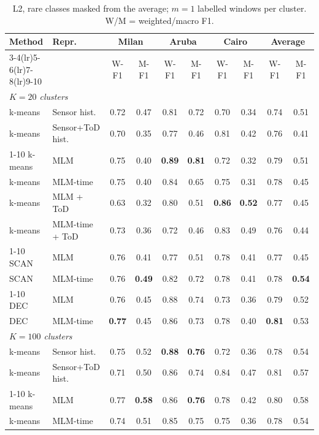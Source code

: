 \begin{table}[t]
\centering\small
\caption{L2, rare classes masked from the average; $m=1$ labelled windows per cluster. W/M = weighted/macro F1.}
\label{tab:l2_masked_m1}
\setlength{\tabcolsep}{4pt}
\begin{tabular}{llcccccc|cc}
\toprule
Method & Repr. & \multicolumn{2}{c}{Milan} & \multicolumn{2}{c}{Aruba} & \multicolumn{2}{c}{Cairo} & \multicolumn{2}{c}{Average} \\
\cmidrule(lr){3-4}\cmidrule(lr){5-6}\cmidrule(lr){7-8}\cmidrule(lr){9-10}
 & & W-F1 & M-F1 & W-F1 & M-F1 & W-F1 & M-F1 & W-F1 & M-F1 \\
\midrule
\multicolumn{10}{l}{\textit{$K = 20$ clusters}} \\
\midrule
k-means & Sensor hist. & 0.72 & 0.47 & 0.81 & 0.72 & 0.70 & 0.34 & 0.74 & 0.51 \\
k-means & Sensor+ToD hist. & 0.70 & 0.35 & 0.77 & 0.46 & 0.81 & 0.42 & 0.76 & 0.41 \\
\cmidrule{1-10}
k-means & MLM & 0.75 & 0.40 & \textbf{0.89} & \textbf{0.81} & 0.72 & 0.32 & 0.79 & 0.51 \\
k-means & MLM-time & 0.75 & 0.40 & 0.84 & 0.65 & 0.75 & 0.31 & 0.78 & 0.45 \\
k-means & MLM + ToD & 0.63 & 0.32 & 0.80 & 0.51 & \textbf{0.86} & \textbf{0.52} & 0.77 & 0.45 \\
k-means & MLM-time + ToD & 0.73 & 0.36 & 0.72 & 0.46 & 0.83 & 0.49 & 0.76 & 0.44 \\
\cmidrule{1-10}
SCAN & MLM & 0.76 & 0.41 & 0.77 & 0.51 & 0.78 & 0.41 & 0.77 & 0.45 \\
SCAN & MLM-time & 0.76 & \textbf{0.49} & 0.82 & 0.72 & 0.78 & 0.41 & 0.78 & \textbf{0.54} \\
\cmidrule{1-10}
DEC & MLM & 0.76 & 0.45 & 0.88 & 0.74 & 0.73 & 0.36 & 0.79 & 0.52 \\
DEC & MLM-time & \textbf{0.77} & 0.45 & 0.86 & 0.73 & 0.78 & 0.40 & \textbf{0.81} & 0.53 \\
\midrule
\multicolumn{10}{l}{\textit{$K = 100$ clusters}} \\
\midrule
k-means & Sensor hist. & 0.75 & 0.52 & \textbf{0.88} & \textbf{0.76} & 0.72 & 0.36 & 0.78 & 0.54 \\
k-means & Sensor+ToD hist. & 0.71 & 0.50 & 0.86 & 0.74 & 0.84 & 0.47 & 0.81 & 0.57 \\
\cmidrule{1-10}
k-means & MLM & 0.77 & \textbf{0.58} & 0.86 & \textbf{0.76} & 0.78 & 0.42 & 0.80 & 0.58 \\
k-means & MLM-time & 0.74 & 0.51 & 0.85 & 0.75 & 0.75 & 0.36 & 0.78 & 0.54 \\

\end{tabular}
\end{table}
